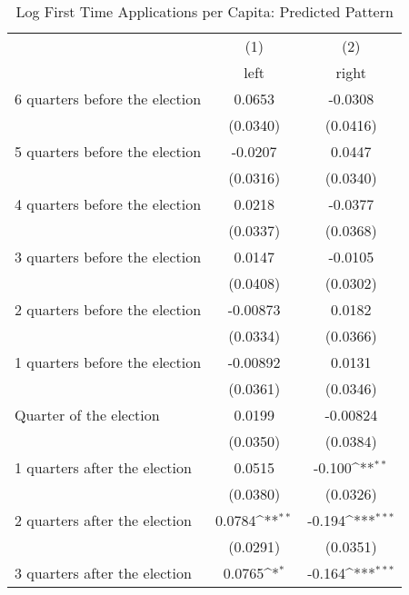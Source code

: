 \begin{table}[htbp]\centering
\def\sym#1{\ifmmode^{#1}\else\(^{#1}\)\fi}
\caption{Log First Time Applications per Capita: Predicted Pattern}
\begin{tabular}{l*{2}{c}}
\hline\hline
                    &\multicolumn{1}{c}{(1)}&\multicolumn{1}{c}{(2)}\\
                    &\multicolumn{1}{c}{left}&\multicolumn{1}{c}{right}\\
\hline
 6 quarters before the election&      0.0653         &     -0.0308         \\
                    &    (0.0340)         &    (0.0416)         \\
[1em]
 5 quarters before the election&     -0.0207         &      0.0447         \\
                    &    (0.0316)         &    (0.0340)         \\
[1em]
 4 quarters before the election&      0.0218         &     -0.0377         \\
                    &    (0.0337)         &    (0.0368)         \\
[1em]
 3 quarters before the election&      0.0147         &     -0.0105         \\
                    &    (0.0408)         &    (0.0302)         \\
[1em]
 2 quarters before the election&    -0.00873         &      0.0182         \\
                    &    (0.0334)         &    (0.0366)         \\
[1em]
 1 quarters before the election&    -0.00892         &      0.0131         \\
                    &    (0.0361)         &    (0.0346)         \\
[1em]
Quarter of the election&      0.0199         &    -0.00824         \\
                    &    (0.0350)         &    (0.0384)         \\
[1em]
 1 quarters after the election&      0.0515         &      -0.100\sym{**} \\
                    &    (0.0380)         &    (0.0326)         \\
[1em]
 2 quarters after the election&      0.0784\sym{**} &      -0.194\sym{***}\\
                    &    (0.0291)         &    (0.0351)         \\
[1em]
 3 quarters after the election&      0.0765\sym{*}  &      -0.164\sym{***}\\

\end{tabular}
\end{table}
